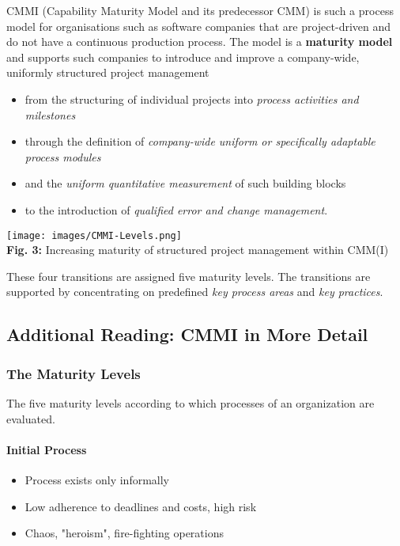\documentclass[11pt,a4paper]{article}
\begin{document}
CMMI (Capability Maturity Model and its predecessor CMM) is such a process
model for organisations such as software companies that are project-driven and
do not have a continuous production process. The model is a \textbf{maturity
  model} and supports such companies to introduce and improve a company-wide,
uniformly structured project management
\begin{itemize} 
\item from the structuring of individual projects into \emph{process
  activities and milestones}
\item through the definition of \emph{company-wide uniform or specifically
  adaptable process modules}
\item and the \emph{uniform quantitative measurement} of such building blocks
\item to the introduction of \emph{qualified error and change management}.
\end{itemize}
\begin{center}
  \texttt{[image: images/CMMI-Levels.png]}\\
  \textbf{Fig. 3:} Increasing maturity of structured project management within
  CMM(I)
\end{center}
These four transitions are assigned five maturity levels. The transitions are
supported by concentrating on predefined \emph{key process areas} and
\emph{key practices}.

\subsection{Additional Reading: CMMI in More Detail}

\subsubsection{The Maturity Levels}

The five maturity levels according to which processes of an organization are
evaluated.

\paragraph {Initial Process}
\begin {itemize} 
\item Process exists only informally
\item Low adherence to deadlines and costs, high risk
\item Chaos, "heroism", fire-fighting operations
\end {itemize}
\end{document}
